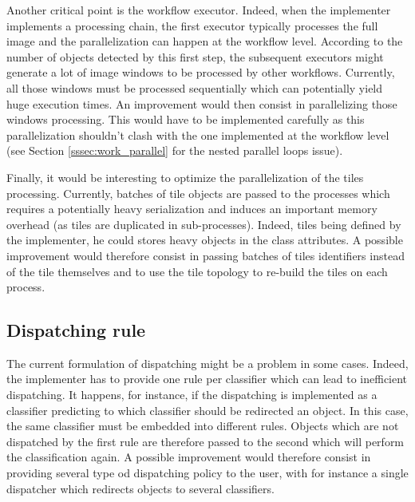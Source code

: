 Another critical point is the workflow executor. Indeed, when the implementer implements a processing chain, the first executor typically processes the full image and the parallelization can happen at the workflow level. According to the number of objects detected by this first step, the subsequent executors might generate a lot of image windows to be processed by other workflows. Currently, all those windows must be processed sequentially which can potentially yield huge execution times. An improvement would then consist in parallelizing those windows processing. This would have to be implemented carefully as this parallelization shouldn't clash with the one implemented at the workflow level (see Section \ref{sssec:work_parallel} for the nested parallel loops issue).

Finally, it would be interesting to optimize the parallelization of the tiles processing. Currently, batches of tile objects are passed to the processes which requires a potentially heavy serialization and induces an important memory overhead (as tiles are duplicated in sub-processes). Indeed, tiles being defined by the implementer, he could stores heavy objects in the class attributes. A possible improvement would therefore consist in passing batches of tiles identifiers instead of the tile themselves and to use the tile topology to re-build the tiles on each process. 

\subsection{Dispatching rule}
The current formulation of dispatching might be a problem in some cases. Indeed, the implementer has to provide one rule per classifier which can lead to inefficient dispatching. It happens, for instance, if the dispatching is implemented as a classifier predicting to which classifier should be redirected an object. In this case, the same classifier must be embedded into different rules. Objects which are not dispatched by the first rule are therefore passed to the second which will perform the classification again. A possible improvement would therefore consist in providing several type od dispatching policy to the user, with for instance a single dispatcher which redirects objects to several classifiers.

\label{sec:work_improvements}